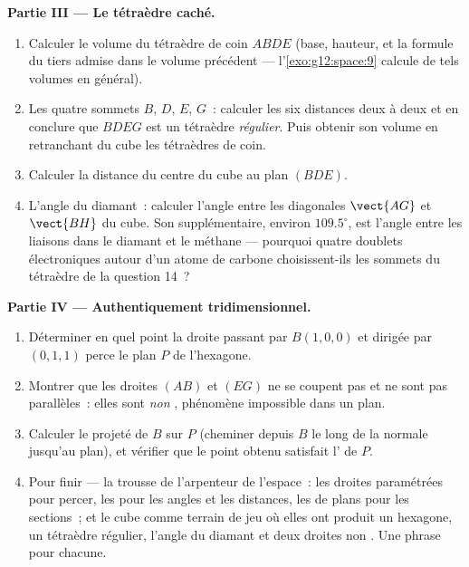\begin{problem}
\medskip
\noindent\textbf{Partie III --- Le tétraèdre caché.}
\begin{enumerate}[resume]
  \item Calculer le volume du tétraèdre de coin $ABDE$ (base,
        hauteur, et la formule du tiers admise dans le volume
        précédent --- l'\cref{exo:g12:space:9} calcule de tels
        volumes en général).
  \item Les quatre sommets $B$, $D$, $E$, $G$~: calculer les six
        distances deux à deux et en conclure que $BDEG$ est un
        tétraèdre \emph{régulier}. Puis obtenir son volume en
        retranchant du cube les tétraèdres de coin.
  \item Calculer la distance du centre du cube au plan $(BDE)$.
  \item L'angle du diamant~: calculer l'angle entre les diagonales
        $\vect{AG}$ et $\vect{BH}$ du cube. Son supplémentaire,
        environ $109.5^\circ$, est l'angle entre les liaisons dans
        le diamant et le méthane --- pourquoi quatre doublets
        électroniques autour d'un atome de carbone choisissent-ils
        les sommets du tétraèdre de la question 14~?
\end{enumerate}

\medskip
\noindent\textbf{Partie IV --- Authentiquement tridimensionnel.}
\begin{enumerate}[resume]
  \item Déterminer en quel point la droite passant par $B(1,0,0)$
        et dirigée par $(0,1,1)$ perce le plan $P$ de l'hexagone.
  \item Montrer que les droites $(AB)$ et $(EG)$ ne se coupent pas
        et ne sont pas parallèles~: elles sont \emph{non
        }, phénomène impossible dans un plan.
  \item Calculer le projeté  de $B$ sur $P$ (cheminer
        depuis $B$ le long de la normale jusqu'au plan), et vérifier
        que le point obtenu satisfait l' de $P$.
  \item Pour finir --- la trousse de l'arpenteur de l'espace~: les
        droites paramétrées pour percer, les  pour
        les angles et les distances, les  de plans pour les
        sections~; et le cube comme terrain de jeu où elles ont
        produit un hexagone, un tétraèdre régulier, l'angle du
        diamant et deux droites non . Une phrase pour
        chacune.
\end{enumerate}
\end{problem}
